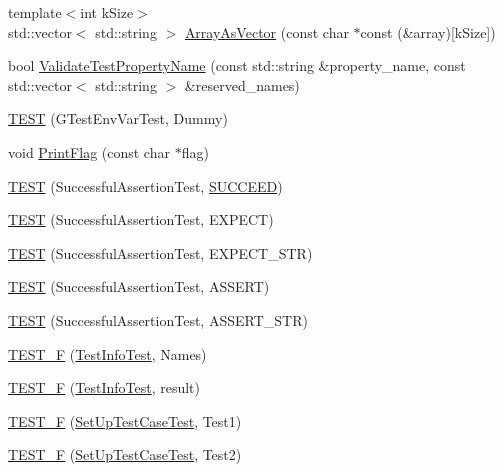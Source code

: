 \begin{DoxyCompactItemize}
\item 
{\footnotesize template$<$int k\+Size$>$ }\\std\+::vector$<$ std\+::string $>$ \hyperlink{namespacetesting_a956d4c522454fa6dfd75b5bbbefe8f9e}{Array\+As\+Vector} (const char $\ast$const (\&array)\mbox{[}k\+Size\mbox{]})
\item 
bool \hyperlink{namespacetesting_a4c9bd414747bf0563bfdb32a2307dcdf}{Validate\+Test\+Property\+Name} (const std\+::string \&property\+\_\+name, const std\+::vector$<$ std\+::string $>$ \&reserved\+\_\+names)
\item 
\hyperlink{namespacetesting_af4187d1b48a2812f1335721ed8f30a99}{T\+E\+S\+T} (G\+Test\+Env\+Var\+Test, Dummy)
\item 
void \hyperlink{namespacetesting_a9863402455bfcf9be5fc0b1453a6d97d}{Print\+Flag} (const char $\ast$flag)
\item 
\hyperlink{namespacetesting_ae0cbea692840c88ab0b03285eb69ac97}{T\+E\+S\+T} (Successful\+Assertion\+Test, \hyperlink{gtest_8h_a75adcdf89f69b0b615e395daafc315af}{S\+U\+C\+C\+E\+E\+D})
\item 
\hyperlink{namespacetesting_af6c8f998f934372e5687d3998068e5e4}{T\+E\+S\+T} (Successful\+Assertion\+Test, E\+X\+P\+E\+C\+T)
\item 
\hyperlink{namespacetesting_a9b1e4b53f277d25e6d6413a0004481bb}{T\+E\+S\+T} (Successful\+Assertion\+Test, E\+X\+P\+E\+C\+T\+\_\+\+S\+T\+R)
\item 
\hyperlink{namespacetesting_afbe4c8233faff6eba04902b3cb041632}{T\+E\+S\+T} (Successful\+Assertion\+Test, A\+S\+S\+E\+R\+T)
\item 
\hyperlink{namespacetesting_a83dfac108c207258287b9f7aa9171e8a}{T\+E\+S\+T} (Successful\+Assertion\+Test, A\+S\+S\+E\+R\+T\+\_\+\+S\+T\+R)
\item 
\hyperlink{namespacetesting_acd53db89097aba1468724d6446069b1e}{T\+E\+S\+T\+\_\+\+F} (\hyperlink{classtesting_1_1_test_info_test}{Test\+Info\+Test}, Names)
\item 
\hyperlink{namespacetesting_ab00e29c00b3e29cdfa21d23b79dd3776}{T\+E\+S\+T\+\_\+\+F} (\hyperlink{classtesting_1_1_test_info_test}{Test\+Info\+Test}, result)
\item 
\hyperlink{namespacetesting_a01e948eb5427d31f70eafaf472e2bfa8}{T\+E\+S\+T\+\_\+\+F} (\hyperlink{classtesting_1_1_set_up_test_case_test}{Set\+Up\+Test\+Case\+Test}, Test1)
\item 
\hyperlink{namespacetesting_a8fc2e448ce96e4da357a2129d49e86e3}{T\+E\+S\+T\+\_\+\+F} (\hyperlink{classtesting_1_1_set_up_test_case_test}{Set\+Up\+Test\+Case\+Test}, Test2)

\end{DoxyCompactItemize}

